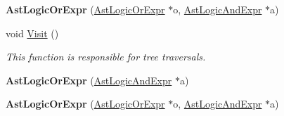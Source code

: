 \begin{DoxyCompactItemize}
\item 
\hypertarget{classAstLogicOrExpr_ade933ad4ec401ffc0dabfb19706fb341}{{\bfseries Ast\-Logic\-Or\-Expr} (\hyperlink{classAstLogicOrExpr}{Ast\-Logic\-Or\-Expr} $\ast$o, \hyperlink{classAstLogicAndExpr}{Ast\-Logic\-And\-Expr} $\ast$a)}\label{classAstLogicOrExpr_ade933ad4ec401ffc0dabfb19706fb341}

\item 
void \hyperlink{classAstLogicOrExpr_acdcdda8eae9c03d8175bbb3527c783eb}{Visit} ()
\begin{DoxyCompactList}\small\item\em This function is responsible for tree traversals. \end{DoxyCompactList}\item 
\hypertarget{classAstLogicOrExpr_a9e3103b546a45090ba81ae88fe72b72e}{{\bfseries Ast\-Logic\-Or\-Expr} (\hyperlink{classAstLogicAndExpr}{Ast\-Logic\-And\-Expr} $\ast$a)}\label{classAstLogicOrExpr_a9e3103b546a45090ba81ae88fe72b72e}

\item 
\hypertarget{classAstLogicOrExpr_ade933ad4ec401ffc0dabfb19706fb341}{{\bfseries Ast\-Logic\-Or\-Expr} (\hyperlink{classAstLogicOrExpr}{Ast\-Logic\-Or\-Expr} $\ast$o, \hyperlink{classAstLogicAndExpr}{Ast\-Logic\-And\-Expr} $\ast$a)}\label{classAstLogicOrExpr_ade933ad4ec401ffc0dabfb19706fb341}


\end{DoxyCompactItemize}
